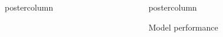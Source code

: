 ﻿\documentclass[final,hyperref={pdfpagelabels=false}]{beamer}
\newlength{\columnheight}
\begin{document}
\begin{frame}
\begin{columns}
\begin{column}{.49\paperwidth}
\begin{beamercolorbox}[center,wd=\textwidth]{postercolumn}
\begin{minipage}[T]{.99\textwidth}
{}
\end{minipage}
\end{beamercolorbox}
\end{column}
 

    
\begin{column}{.49\paperwidth}
\begin{beamercolorbox}[center,wd=\textwidth]{postercolumn}
\begin{minipage}[T]{.99\textwidth} %
\parbox[t][\columnheight]{\textwidth}{ %
            

 \begin{block}{Model performance}
 \begin{columns}
 \begin{column}{1\textwidth}


\vspace{-1cm}

\centering
\begin{minipage}[t]{0.96\textwidth}
			

\end{minipage}
\end{column}
\end{columns}
\end{block}}
\end{minipage}
\end{beamercolorbox}
\end{column}
\end{columns}
\end{frame}
\end{document}
